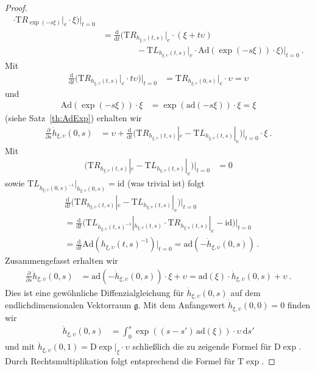 \documentclass[10pt,a4paper]{article}
\theoremstyle{mytheorem}
\theoremstyle{mydefinition}
\newcommand{\dt}{\mathrm{d}}
\newcommand{\Dt}{\mathrm{D}}
\newcommand{\Tt}{\mathrm{T}}
\newcommand{\ad}{\mathrm{ad}}
\newcommand{\Ad}{\mathrm{Ad}}
\begin{document}
\begin{proof}
\begin{align*}
		\cdot
		\Tt R_{\exp(-s\xi)}
		|_e
		\cdot
		\xi
	\Big)	
	\Big|_{t=0}
	\nonumber\\	
	&=
	\frac{\dt}{\dt t}	
	\Big(
		\Tt R_{h_{\xi, \upsilon}(t, s)}
		|_e
		\cdot
		(\xi + t\upsilon)
	\nonumber\\
	&\qquad\qquad-
		\Tt L_{h_{\xi, \upsilon}(t, s)}
		|_{e}	
		\cdot
		\Ad(\exp(-s\xi))
		\cdot
		\xi
	\Big)	
	\Big|_{t=0}
	\ .
\end{align*}
Mit
\begin{align*}
	\frac{\dt}{\dt t}	
	\Big(
		\Tt R_{h_{\xi, \upsilon}(t, s)}
		|_e
		\cdot
		t\upsilon
	\Big)
	\Big|_{t=0}
	&=
	\Tt R_{h_{\xi, \upsilon}(0, s)}
	|_e
	\cdot
	\upsilon
	= \upsilon
\end{align*}
und
\begin{align*}
	\Ad(\exp(-s\xi))\cdot\xi
	&= \exp(\ad(-s\xi))\cdot\xi
	= \xi
\end{align*}
(siehe Satz~\ref{th:AdExp}) erhalten wir 
\begin{align*}
	\frac{\partial}{\partial s}
	\dot{h}_{\xi, \upsilon}(0, s)	
	&=
	\upsilon +
	\frac{\dt}{\dt t}		
	\Big(
		\Tt R_{h_{\xi, \upsilon}(t, s)}
		|_e -
		\Tt L_{h_{\xi, \upsilon}(t, s)}
		|_{e}
	\Big)
	\Big|_{t=0}
	\cdot\xi
	\ .
\end{align*}
Mit
\begin{align*}
	\big(
	\Tt R_{h_{\xi, \upsilon}(t, s)}
	|_e -
	\Tt L_{h_{\xi, \upsilon}(t, s)}
	|_{e}
	\big)\big|_{t=0}
	&= 0
\end{align*}
sowie $\Tt L_{h_{\xi, \upsilon}(0, s)^{-1}}|_{h_{\xi, \upsilon}(0, s)}=\mathrm{id}$ (was trivial ist) folgt
\begin{align*}
	&\frac{\dt}{\dt t}	
	\Big(
		\Tt R_{h_{\xi, \upsilon}(t, s)}
		|_e -
		\Tt L_{h_{\xi, \upsilon}(t, s)}
		|_{e}	
	\Big)	
	\Big|_{t=0}
	\nonumber\\
	&=
	\frac{\dt}{\dt t}
	\big(
		\Tt L_{h_{\xi, \upsilon}(t, s)^{-1}}
		|_{h_{\xi, \upsilon}(t, s)} \cdot
		\Tt R_{h_{\xi, \upsilon}(t, s)}
		|_e -
		\mathrm{id}	
	\big)
	\Big|_{t=0}
	\nonumber\\
	&=
	\frac{\dt}{\dt t}
		\Ad(h_{\xi, \upsilon}(t, s)^{-1})
	\Big|_{t=0}
	= \ad(-\dot{h}_{\xi, \upsilon}(0, s))
	\ .
\end{align*}
Zusammengefasst erhalten wir
\begin{align*}
	\frac{\partial}{\partial s}
	\dot{h}_{\xi, \upsilon}(0, s)
	&=
	\ad(-\dot{h}_{\xi, \upsilon}(0, s))\cdot\xi + \upsilon
	= \ad(\xi)\cdot\dot{h}_{\xi, \upsilon}(0, s) + \upsilon
	\ .
\end{align*}
Dies ist eine gewöhnliche Diffenzialgleichung für $\dot{h}_{\xi, \upsilon}(0, s)$ auf dem endlichdimensionalen Vektorraum $\mathfrak{g}$.
Mit dem Anfangswert $\dot{h}_{\xi, \upsilon}(0, 0)=0$ finden wir
\begin{align*}
	\dot{h}_{\xi, \upsilon}(0, s)
	&=
	\int_0^s
	\exp((s-s')\,\ad(\xi))\cdot{\upsilon}
	\ \dt s'
\end{align*}
und mit $\dot{h}_{\xi, \upsilon}(0, 1)=\Dt\exp|_{\xi}\cdot\upsilon$ schließlich die zu zeigende Formel für $\Dt\exp$.
Durch Rechtsmultiplikation folgt entsprechend die Formel für $\Tt\exp$.
\end{proof}
\end{document}
